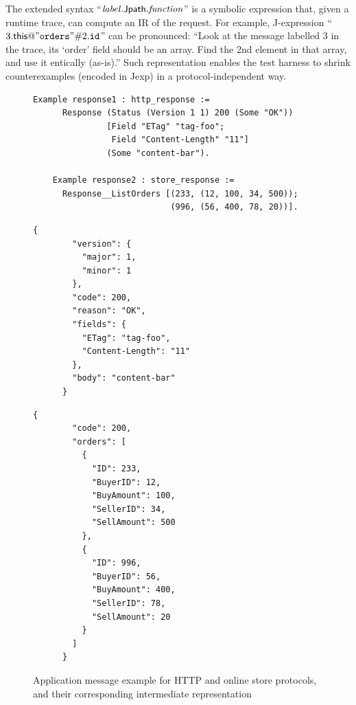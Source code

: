 The extended syntax
``$\mathit{label}.\mathsf{Jpath}.\mathit{function}$'' is a symbolic
expression that, given a runtime trace, can compute an IR of the request.  For
example, J-expression
``$3.\mathsf{this}@\mathtt{"orders"}\#2.\mathtt{id}$'' can be
pronounced: ``Look at the message labelled 3 in the trace, its `order' field
should be an array.  Find the 2nd element in that array, and use it
entically (as-is).''  Such representation enables the test harness to
shrink counterexamples (encoded in Jexp) in a protocol-independent way.


\begin{figure}
  \begin{lstlisting}[style=customcoq]
    Example response1 : http_response :=
      Response (Status (Version 1 1) 200 (Some "OK"))
               [Field "ETag" "tag-foo";
                Field "Content-Length" "11"]
               (Some "content-bar").

    Example response2 : store_response :=
      Response__ListOrders [(233, (12, 100, 34, 500));
                            (996, (56, 400, 78, 20))].
  \end{lstlisting}
  \begin{minipage}[t]{.4\textwidth}
    \begin{lstlisting}[style=json]
      {
        "version": {
          "major": 1,
          "minor": 1
        },
        "code": 200,
        "reason": "OK",
        "fields": {
          "ETag": "tag-foo",
          "Content-Length": "11"
        },
        "body": "content-bar"
      }
    \end{lstlisting}
  \end{minipage}%
  \begin{minipage}[t]{.4\textwidth}
    \begin{lstlisting}[style=json]
      {
        "code": 200,
        "orders": [
          {
            "ID": 233,
            "BuyerID": 12,
            "BuyAmount": 100,
            "SellerID": 34,
            "SellAmount": 500
          },
          {
            "ID": 996,
            "BuyerID": 56,
            "BuyAmount": 400,
            "SellerID": 78,
            "SellAmount": 20
          }
        ]
      }
    \end{lstlisting}
  \end{minipage}
  \caption{Application message example for HTTP and online store protocols, and
    their corresponding intermediate representation}
  \label{fig:ir}
\end{figure}

